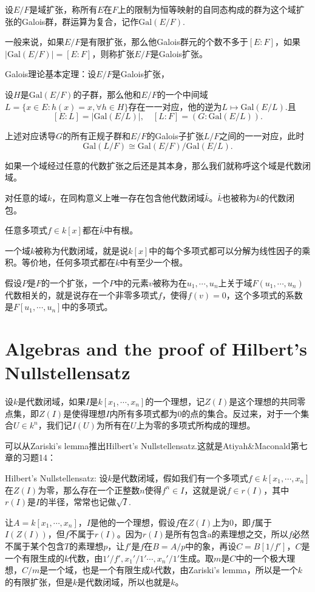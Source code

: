\para 设$E/F$是域扩张，称所有$E$在$F$上的限制为恒等映射的自同态构成的群为这个域扩张的Galois群，群运算为复合，记作$\mathrm{Gal}(E/F)$.

一般来说，如果$E/F$是有限扩张，那么他Galois群元的个数不多于$[E:F]$，如果$|\mathrm{Gal}(E/F)|=[E:F]$，则称扩张$E/F$是Galois扩张。

\theo Galois理论基本定理：设$E/F$是Galois扩张，

 设$H$是$\mathrm{Gal}(E/F)$的子群，那么他和$E/F$的一个中间域$L=\{x\in E:h(x)=x,\forall h\in H\}$存在一一对应，他的逆为$L\mapsto \mathrm{Gal}(E/L)$.且
\[
[E:L]=|\mathrm{Gal}(E/L)|,\quad [L:F]=(G:\mathrm{Gal}(E/L)).
\]

 上述对应诱导$G$的所有正规子群和$E/F$的Galois子扩张$L/F$之间的一一对应，此时
\[
	\mathrm{Gal}(L/F)\cong \mathrm{Gal}(E/F)/\mathrm{Gal}(E/L).
\]

如果一个域经过任意的代数扩张之后还是其本身，那么我们就称呼这个域是代数闭域。

\theo 对任意的域$k$，在同构意义上唯一存在包含他代数闭域$\bar{k}$。$\bar{k}$也被称为$k$的代数闭包。

\pro 任意多项式$f\in k[x]$都在$\bar{k}$中有根。

\para 一个域$k$被称为代数闭域，就是说$k[x]$中的每个多项式都可以分解为线性因子的乘积。等价地，任何多项式都在$k$中有至少一个根。

\para 假设$P$是$F$的一个扩张，一个$P$中的元素$v$被称为在$u_1,\cdots ,u_n$上关于域$F(u_1,\cdots ,u_n)$代数相关的，就是说存在一个非零多项式$f$，使得$f(v)=0$，这个多项式的系数是$F[u_1,\cdots ,u_n]$中的多项式。

\section{Algebras and the proof of Hilbert's Nullstellensatz}

\para 设$k$是代数闭域，如果$I$是$k[x_1,\cdots,x_n]$的一个理想，记$Z(I)$是这个理想的共同零点集，即$Z(I)$是使得理想$I$内所有多项式都为$0$的点的集合。反过来，对于一个集合$U\in k^n$，我们记$I(U)$为所有在$U$上为零的多项式所构成的理想。

可以从Zariski's lemma推出Hilbert's Nullstellensatz.这就是Atiyah\&Maconald第七章的习题14：

\theo Hilbert's Nullstellensatz: 设$k$是代数闭域，假如我们有一个多项式$f\in k[x_1,\cdots,x_n]$在$Z(I)$为零，那么存在一个正整数$n$使得$f^n\in I$，这就是说$f\in r(I)$，其中$r(I)$是$I$的半径，常常也记做$\sqrt{I}$.

\proof 让$A=k[x_1,\cdots ,x_n]$，$I$是他的一个理想，假设$f$在$Z(I)$上为0，即$f$属于$I(Z(I))$，但$f$不属于$r(I)$。因为$r(I)$是所有包含a的素理想之交，所以$f$必然不属于某个包含$T$的素理想$p$，让$f'$是$f$在$B=A/p$中的象，再设$C=B[1/f']$，$C$是一个有限生成的$k$代数，由${1'/f',x_1'/1'\cdots ,x_n'/1'}$生成。取$m$是$C$中的一个极大理想，$C/m$是一个域，也是一个有限生成$k$代数，由Zariski's lemma，所以是一个$k$的有限扩张，但是$k$是代数闭域，所以也就是$k$。

